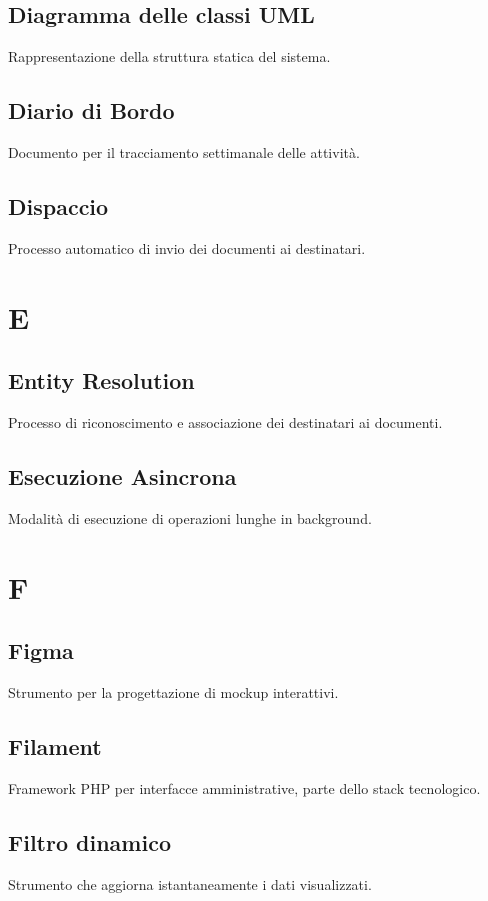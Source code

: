 \documentclass[a4paper,12pt]{article}
\begin{document}
\subsection{Diagramma delle classi UML}
Rappresentazione della struttura statica del sistema.

\subsection{Diario di Bordo}
Documento per il tracciamento settimanale delle attività.

\subsection{Dispaccio}
Processo automatico di invio dei documenti ai destinatari.

\section{E}

\subsection{Entity Resolution}
Processo di riconoscimento e associazione dei destinatari ai documenti.

\subsection{Esecuzione Asincrona}
Modalità di esecuzione di operazioni lunghe in background.

\section{F}
\subsection{Figma}
Strumento per la progettazione di mockup interattivi.

\subsection{Filament}
Framework PHP per interfacce amministrative, parte dello stack tecnologico.

\subsection{Filtro dinamico}
Strumento che aggiorna istantaneamente i dati visualizzati.
\end{document}
